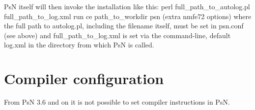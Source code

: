 PsN itself will then invoke the installation like this:
perl full\_path\_to\_autolog.pl full\_path\_to\_log.xml run ce path\_to\_workdir psn (extra nmfe72 options)
where the full path to autolog.pl, including the filename itself, must be set in psn.conf (see above) and full\_path\_to\_log.xml is set via the command-line, default log.xml in the directory from which PsN is called.

\section{Compiler configuration}

From PsN 3.6 and on it is not possible to set compiler instructions in PsN.


